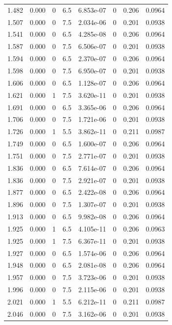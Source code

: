 \documentclass[preview]{standalone}
\begin{document}
{{{\begin{tabular}{L{1.2cm}C{1.2cm} C{0.3cm}C{0.5cm} C{1.4cm}C{1.4cm} C{1.4cm}C{1.4cm}}
  1.482  &  0.000  & 0     & 6.5 &  6.853e-07  & 0  & 0.206 &  0.0964   \\ 
  1.507  &  0.000  & 0     & 7.5 &  2.034e-06  & 0  & 0.201 &  0.0938   \\ 
  1.541  &  0.000  & 0     & 6.5 &  4.285e-08  & 0  & 0.206 &  0.0964   \\ 
  1.587  &  0.000  & 0     & 7.5 &  6.506e-07  & 0  & 0.201 &  0.0938   \\ 
  1.594  &  0.000  & 0     & 6.5 &  2.370e-07  & 0  & 0.206 &  0.0964   \\ 
  1.598  &  0.000  & 0     & 7.5 &  6.950e-07  & 0  & 0.201 &  0.0938   \\ 
  1.606  &  0.000  & 0     & 6.5 &  1.128e-07  & 0  & 0.206 &  0.0964   \\ 
  1.621  &  0.000  & 1     & 7.5 &  3.620e-11  & 0  & 0.201 &  0.0938   \\ 
  1.691  &  0.000  & 0     & 6.5 &  3.365e-06  & 0  & 0.206 &  0.0964   \\ 
  1.706  &  0.000  & 0     & 7.5 &  1.721e-06  & 0  & 0.201 &  0.0938   \\ 
  1.726  &  0.000  & 1     & 5.5 &  3.862e-11  & 0  & 0.211 &  0.0987   \\ 
  1.749  &  0.000  & 0     & 6.5 &  1.600e-07  & 0  & 0.206 &  0.0964   \\ 
  1.751  &  0.000  & 0     & 7.5 &  2.771e-07  & 0  & 0.201 &  0.0938   \\ 
  1.836  &  0.000  & 0     & 6.5 &  7.614e-07  & 0  & 0.206 &  0.0964   \\ 
  1.836  &  0.000  & 0     & 7.5 &  2.921e-07  & 0  & 0.201 &  0.0938   \\ 
  1.877  &  0.000  & 0     & 6.5 &  2.422e-08  & 0  & 0.206 &  0.0964   \\ 
  1.896  &  0.000  & 0     & 7.5 &  1.307e-07  & 0  & 0.201 &  0.0938   \\ 
  1.913  &  0.000  & 0     & 6.5 &  9.982e-08  & 0  & 0.206 &  0.0964   \\ 
  1.925  &  0.000  & 1     & 6.5 &  4.105e-11  & 0  & 0.206 &  0.0963   \\ 
  1.925  &  0.000  & 1     & 7.5 &  6.367e-11  & 0  & 0.201 &  0.0938   \\ 
  1.927  &  0.000  & 0     & 6.5 &  1.574e-06  & 0  & 0.206 &  0.0964   \\ 
  1.948  &  0.000  & 0     & 6.5 &  2.081e-08  & 0  & 0.206 &  0.0964   \\ 
  1.957  &  0.000  & 0     & 7.5 &  3.723e-06  & 0  & 0.201 &  0.0938   \\ 
  1.996  &  0.000  & 0     & 7.5 &  2.115e-06  & 0  & 0.201 &  0.0938   \\ 
  2.021  &  0.000  & 1     & 5.5 &  6.212e-11  & 0  & 0.211 &  0.0987   \\ 
  2.046  &  0.000  & 0     & 7.5 &  3.162e-06  & 0  & 0.201 &  0.0938   \\ 
\hline 
\end{tabular} 

}}}
\end{document}
